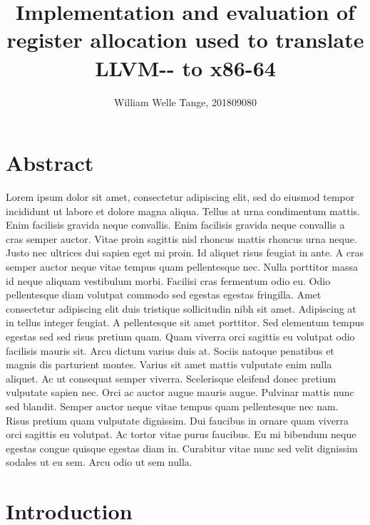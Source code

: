 \documentclass{article}
\title{\myfont Implementation and evaluation of register allocation used to translate LLVM-{}- to x86-64}
\author{William Welle Tange, 201809080}
\begin{document}
\maketitle
\begin{center}

\end{center}
\newpage


\section*{Abstract}
Lorem ipsum dolor sit amet, consectetur adipiscing elit, sed do eiusmod tempor incididunt ut labore et dolore magna aliqua. Tellus at urna condimentum mattis. Enim facilisis gravida neque convallis. Enim facilisis gravida neque convallis a cras semper auctor. Vitae proin sagittis nisl rhoncus mattis rhoncus urna neque. Justo nec ultrices dui sapien eget mi proin. Id aliquet risus feugiat in ante. A cras semper auctor neque vitae tempus quam pellentesque nec. Nulla porttitor massa id neque aliquam vestibulum morbi. Facilisi cras fermentum odio eu. Odio pellentesque diam volutpat commodo sed egestas egestas fringilla. Amet consectetur adipiscing elit duis tristique sollicitudin nibh sit amet. Adipiscing at in tellus integer feugiat. A pellentesque sit amet porttitor. Sed elementum tempus egestas sed sed risus pretium quam. Quam viverra orci sagittis eu volutpat odio facilisis mauris sit. Arcu dictum varius duis at. Sociis natoque penatibus et magnis dis parturient montes. Varius sit amet mattis vulputate enim nulla aliquet. Ac ut consequat semper viverra. Scelerisque eleifend donec pretium vulputate sapien nec. Orci ac auctor augue mauris augue. Pulvinar mattis nunc sed blandit. Semper auctor neque vitae tempus quam pellentesque nec nam. Risus pretium quam vulputate dignissim. Dui faucibus in ornare quam viverra orci sagittis eu volutpat. Ac tortor vitae purus faucibus. Eu mi bibendum neque egestas congue quisque egestas diam in. Curabitur vitae nunc sed velit dignissim sodales ut eu sem. Arcu odio ut sem nulla.
\newpage

\tableofcontents
\newpage




    
\setcounter{page}{1}

\section{Introduction}
\end{document}
